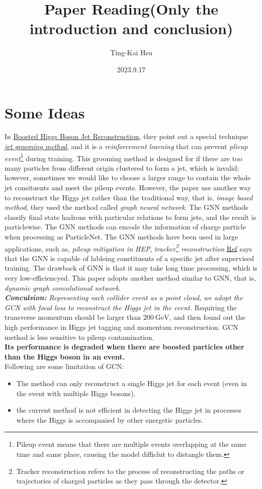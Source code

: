\documentclass[12pt]{article}
\title{Paper Reading(Only the introduction and conclusion)}
\author{Ting-Kai Hsu}
\date{2023.9.17}
\numberwithin{equation}{section}
\begin{document}
\maketitle
\tableofcontents

\section{Some Ideas}

In \href{https://arxiv.org/abs/2010.05464}{Boosted Higgs Boson Jet Reconstruction}, they point out a special technique \href{https://arxiv.org/abs/1903.09644}{\textit{jet grooming method}}, and it is a \textit{reinforcement learning} that can prevent \textit{plieup event}\footnote{Pileup event means that there are multiple events overlapping at the same time and same place, causing the model difficlut to distangle them.} during training.
This grooming method is designed for if there are too many particles from different origin clustered to form a jet, which is invalid; however, sometimes we would like to choose a larger range to contain the whole jet consituents and meet the pileup events.
However, the paper use another way to reconstruct the Higgs jet rather than the traditional way, that is, \textit{image based method}, they used the method called \textit{graph neural network}.
The GNN methods classify final state hadrons with particular relations to form jets, and the result is particlewise.
The GNN methods can encode the information of charge particle when processing as ParticleNet.
The GNN methods have been used in large applications, such as, \textit{pileup mitigation in HEP}, \textit{tracker\footnote{Tracker reconstruction refers to the process of reconstructing the paths or trajectories of charged particles as they pass through the detector.} reconstruction}
\href{https://arxiv.org/abs/2008.06064}{Ref} says that the GNN is capable of lableing constituents of a specific jet after supervised training.
The drawback of GNN is that it may take long time processing, which is very low-efficiencyed.
This paper adopts another method similar to GNN, that is, \textit{dynamic graph convolutional network}.
\\
\indent \textit{\textbf{Conculsion:} Representing each collider event as a point cloud, we adopt the GCN with focal loss to reconstruct the Higgs jet in the event.} Requiring the transverse momentum should be larger than $200\ \text{GeV}$, and then found out the high performance in Higgs jet tagging and momentum reconstruction.
GCN method is less sensitive to pileup contamination.
\\
\indent \textbf{Its performance is degraded when there are boosted particles other than the Higgs boson in an event.}
\\
\indent Following are some limitation of GCN:

\begin{itemize}
    \item The method can only reconstruct a single Higgs jet for each event (even in the event with multiple Higgs bosons).
    \item the current method is not efficient in detecting the Higgs jet in processes where the Higgs is accompanied by other energetic particles.
\end{itemize}
\end{document}
